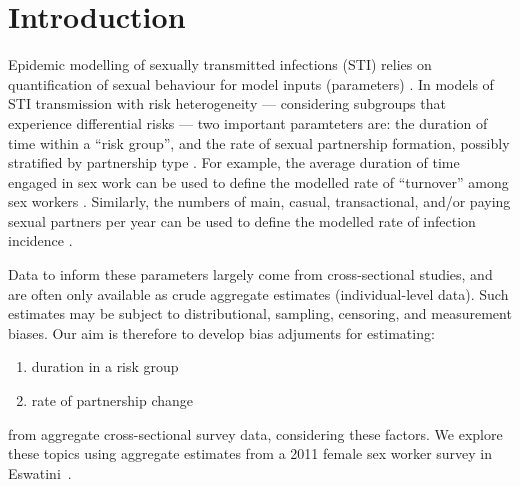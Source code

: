 \section{Introduction}
Epidemic modelling of sexually transmitted infections (STI) relies on
quantification of sexual behaviour for model inputs (parameters) \cite{Garnett2002}.
In models of STI transmission with risk heterogeneity
--- \ie considering subgroups that experience differential risks ---
two important paramteters are:
the duration of time within a ``risk group'', and
the rate of sexual partnership formation, possibly stratified by partnership type
\cite{Garnett1996,Stigum1997,Watts2010,Knight2020}.
For example, the average duration of time engaged in sex work
can be used to define the modelled rate of ``turnover'' among sex workers \cite{Watts2010}.
Similarly, the numbers of main, casual, transactional, and/or paying sexual partners per year
can be used to define the modelled rate of infection incidence \cite{Boily2015}.
\par
Data to inform these parameters largely come from cross-sectional studies,
and are often only available as crude aggregate estimates (\vs individual-level data).
Such estimates may be subject to distributional, sampling, censoring, and measurement biases.
Our aim is therefore to develop bias adjuments for estimating:
\begin{enumerate}
  \item duration in a risk group
  \item rate of partnership change
\end{enumerate}
from aggregate cross-sectional survey data, considering these factors.
We explore these topics using aggregate estimates from
a 2011 female sex worker survey in Eswatini~\cite{Baral2014}.
